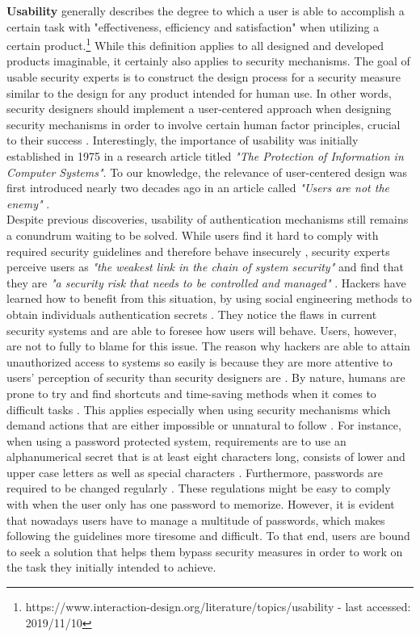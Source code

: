 \textbf{Usability} generally describes the degree to which a user is able to accomplish a certain task with "effectiveness, efficiency and satisfaction" when utilizing a certain product.\footnote{https://www.interaction-design.org/literature/topics/usability - last accessed: 2019/11/10} While this definition applies to all designed and developed products imaginable, it certainly also applies to security mechanisms. The goal of usable security experts is to construct the design process for a security measure similar to the design for any product intended for human use. In other words, security designers should implement a user-centered approach when designing security mechanisms in order to involve certain human factor principles, crucial to their success \cite{Adams:1999:UE:322796.322806, sasse}. Interestingly, the importance of usability was initially established in 1975 in a research article titled \textit{"The Protection of Information in Computer Systems"}. To our knowledge, the relevance of user-centered design was first introduced nearly two decades ago in an article called \textit{"Users are not the enemy"} \cite{Adams:1999:UE:322796.322806}. \\

Despite previous discoveries, usability of authentication mechanisms still remains a conundrum waiting to be solved. While users find it hard to comply with required security guidelines and therefore behave insecurely \cite{Adams:1999:UE:322796.322806, sasse}, security experts perceive users as \textit{"the weakest link in the chain of system security"} \cite{sasse} and find that they are \textit{"a security risk that needs to be controlled and managed"}  \cite{Adams:1999:UE:322796.322806}. Hackers have learned how to benefit from this situation, by using social engineering methods to obtain individuals authentication secrets \cite{Adams:1999:UE:322796.322806, sasse}. They notice the flaws in current security systems and are able to foresee how users will behave. Users, however, are not to fully to blame for this issue. The reason why hackers are able to attain unauthorized access to systems so easily is because they are more attentive to users' perception of security than security designers are \cite{Adams:1999:UE:322796.322806}. By nature, humans are prone to try and find shortcuts and time-saving methods when it comes to difficult tasks \cite{sasse}. This applies especially when using security mechanisms which demand actions that are either impossible or unnatural to follow \cite{sasse}. For instance, when using a password protected system, requirements are to use an alphanumerical secret that is at least eight characters long, consists of lower and upper case letters as well as special characters \cite{payne, sasse}. Furthermore, passwords are required to be changed regularly \cite{adams2,gorman}. These regulations might be easy to comply with when the user only has one password to memorize. However, it is evident that nowadays users have to manage a multitude of passwords, which makes following the guidelines more tiresome and difficult. To that end, users are bound to seek a solution that helps them bypass security measures in order to work on the task they initially intended to achieve. \\


